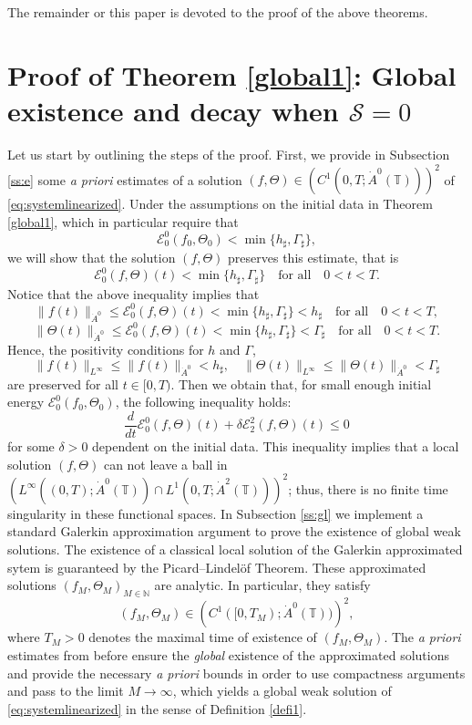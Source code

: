 \documentclass[reqno,11pt]{amsart}
\newcommand{\NN}{{\mathbb N}}
\newcommand{\TT}{{\mathbb T}}
\newcommand{\bh}{h_\sharp}
\newcommand{\bG}{\Gamma_\sharp}
\begin{document}
{The remainder or this paper is devoted to the proof of the above theorems.


\section{Proof of Theorem \ref{global1}: Global existence and decay when $\mathcal{S}=0$} 
\label{S:T1}
Let us start by outlining the steps of the proof. First, we provide in Subsection \ref{ss:e} some \emph{a priori} estimates of a solution $(f,\Theta)\in \left(C^1(0,T;\dot A^0(\TT))\right)^2$ of \eqref{eq:systemlinearized}. Under the assumptions on the initial data in Theorem \ref{global1}, which in particular require that
\[
	\mathscr{E}_0^0(f_0,\Theta_0)<\min\{\bh,\bG\},
\] 
we will show that the solution $(f,\Theta)$ preserves this estimate, that is
$$
\mathscr{E}_0^0(f,\Theta)(t)<\min\{\bh,\bG\}\quad\mbox{for all}\quad 0<t<T.
$$
Notice that the above inequality  implies that
$$
\|f(t)\|_{\dot A^0}\leq \mathscr{E}_0^0(f,\Theta)(t)<\min\{\bh,\bG\}<\bh \quad\mbox{for all}\quad 0<t<T,
$$
$$
\|\Theta(t)\|_{\dot A^0}\leq \mathscr{E}_0^0(f,\Theta)(t)<\min\{\bh,\bG\}<\bG \quad\mbox{for all}\quad 0<t<T.
$$
Hence, the positivity conditions for $h$ and $\Gamma$, 
$$
\|f(t)\|_{L^\infty}\leq \|f(t)\|_{\dot A^0} < \bh,\quad \|\Theta(t)\|_{L^\infty}\leq \|\Theta(t)\|_{\dot A^0}<\bG 
$$
are preserved for all $t\in [0,T)$. Then we obtain that, for small enough initial energy $\mathscr{E}^0_0(f_0,\Theta_0)$, the following inequality holds:
$$
\frac{d}{dt} \mathscr{E}^0_0(f,\Theta)(t)+\delta \mathscr{E}^2_2(f,\Theta)(t)\leq 0
$$
for some $\delta>0$ dependent on the initial data.
This inequality implies that a local solution $(f,\Theta)$ can not leave a ball in $(L^\infty((0,T); \dot A^0(\TT))\cap L^1(0,T;\dot A^2(\TT)))^2$; thus, there is no finite time singularity in these functional spaces. 
In Subsection \ref{ss:gl} we implement a standard Galerkin approximation argument to prove the existence of global weak solutions. The existence of a classical local solution of the Galerkin approximated sytem is guaranteed by the Picard--Lindel\"of Theorem.  These approximated solutions $(f_M,\Theta_M)_{M\in \NN}$ are analytic. In particular, they satisfy 
$$
(f_M,\Theta_M)\in \left(C^1([0,T_M); \dot A^0(\TT))\right)^2,
$$ where $T_M>0$ denotes the maximal time of existence of $(f_M,\Theta_M)$. The \emph{a priori} estimates from before ensure the \emph{global} existence of the approximated solutions and provide the necessary \emph{a priori} bounds in order to use compactness arguments and pass to the limit $M\to \infty$, which yields a global weak solution of \eqref{eq:systemlinearized} in the sense of Definition \ref{defi1}. 
}
\end{document}
